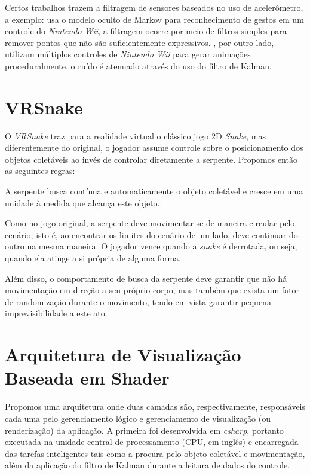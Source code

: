 \documentclass{vgtc}                          %
\begin{document}
Certos trabalhos trazem a filtragem de sensores baseados no uso de acelerômetro, a exemplo: \cite{schlomer2008gesture} usa o modelo oculto de Markov para reconhecimento de gestos em um controle do \textit{Nintendo Wii}, a filtragem ocorre por meio de filtros simples para remover pontos que não são suficientemente expressivos. \cite{shiratori2008accelerometer}, por outro lado, utilizam múltiplos controles de \textit{Nintendo Wii} para gerar animações proceduralmente, o ruído é atenuado através do uso do filtro de Kalman.

\section{VRSnake} \label{sec:vrsnake}
O \textit{VRSnake} traz para a realidade virtual o clássico jogo 2D \textit{Snake}, mas diferentemente do original, o jogador assume controle sobre o posicionamento dos objetos coletáveis ao invés de controlar diretamente a serpente. Propomos então as seguintes regras:

A serpente busca contínua e automaticamente o objeto coletável e cresce em uma unidade à medida que alcança este objeto.

Como no jogo original, a serpente deve movimentar-se de maneira circular pelo cenário, isto é, ao encontrar os limites do cenário de um lado, deve continuar do outro na mesma maneira. O jogador vence quando a \textit{snake} é derrotada, ou seja, quando ela atinge a si própria de alguma forma.

Além disso, o comportamento de busca da serpente deve garantir que não há movimentação em direção a seu próprio corpo, mas também que exista um fator de randomização durante o movimento, tendo em vista garantir pequena imprevisibilidade a este ato.

\section{Arquitetura de Visualização Baseada em Shader} \label{sec:architecture}
Propomos uma arquitetura onde duas camadas são, respectivamente, responsáveis cada uma pelo gerenciamento lógico e gerenciamento de visualização (ou renderização) da aplicação. A primeira foi desenvolvida em \textit{csharp}, portanto executada na unidade central de processamento (CPU, em inglês) e encarregada das tarefas inteligentes tais como a procura pelo objeto coletável e movimentação, além da aplicação do filtro de Kalman durante a leitura de dados do controle.
\end{document}
